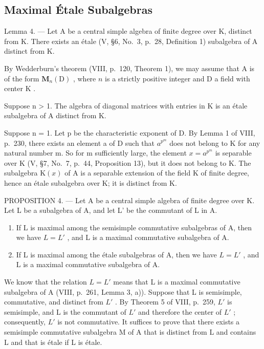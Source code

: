 \subsection{Maximal Étale Subalgebras}

Lemma 4. --- Let A be a central simple algebra of finite degree over K, distinct from K. There exists an étale (V, §6, No.~3, p.~28, Definition 1) subalgebra of A distinct from K.

By Wedderburn's theorem (VIII, p.~120, Theorem 1), we may assume that \(\mathrm{A}\) is of the form \(\mathbf{M}_n(\mathrm{D})\) , where \(n\) is a strictly positive integer and \(\mathrm{D}\) a field with center \(\mathrm{K}\) .

Suppose n \textgreater{} 1. The algebra of diagonal matrices with entries in K is an étale subalgebra of A distinct from K.

Suppose n = 1. Let p be the characteristic exponent of D. By Lemma 1 of VIII, p.~230, there exists an element a of D such that \(a^{p^{m}}\) does not belong to K for any natural number m. So for m sufficiently large, the element \(x = a^{p^{m}}\) is separable over K (V, §7, No.~7, p.~44, Proposition 13), but it does not belong to K. The subalgebra \(\mathrm{K}(x)\) of A is a separable extension of the field K of finite degree, hence an étale subalgebra over K; it is distinct from K.

PROPOSITION 4. --- Let A be a central simple algebra of finite degree over K. Let L be a subalgebra of A, and let L' be the commutant of L in A.

\begin{enumerate}
\def\labelenumi{\alph{enumi})}
\item
  If L is maximal among the semisimple commutative subalgebras of A, then we have \(L = L'\) , and L is a maximal commutative subalgebra of A.
\item
  If L is maximal among the étale subalgebras of A, then we have \(L = L'\) , and L is a maximal commutative subalgebra of A.
\end{enumerate}

We know that the relation \(L = L'\) means that L is a maximal commutative subalgebra of A (VIII, p.~261, Lemma 3, a)). Suppose that L is semisimple, commutative, and distinct from \(L'\) . By Theorem 5 of VIII, p.~259, \(L'\) is semisimple, and L is the commutant of \(L'\) and therefore the center of \(L'\) ; consequently, \(L'\) is not commutative. It suffices to prove that there exists a semisimple commutative subalgebra M of A that is distinct from L and contains L and that is étale if L is étale.

